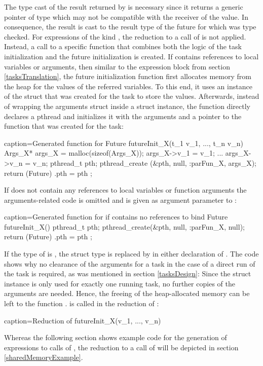 The type cast of the result returned by  is necessary since it returns a generic pointer of type  which may not be compatible with the receiver of the value. In consequence, the result is cast to the result type of the future for which  was type checked. 
For expressions of the kind , the reduction to a call of  is not applied. Instead, a call to a specific function  that combines both the logic of the task initialization and the future initialization is created. If  contains references to local variables or arguments, then similar to the  expression block from section \ref{tasksTranslation}, the future initialization function first allocates memory from the heap for the values of the referred variables. To this end, it uses an instance of the  struct that was created for the task to store the values. Afterwards, instead of wrapping the arguments struct inside a  struct instance, the function directly declares a pthread and initializes it with the arguments and a pointer to the function  that was created for the task:
\vspace{4mm}
\begin{ccode}{caption=Generated function for }
Future futureInit_X(t_1 v_1, ..., t_n v_n) { 
  Args_X* args_X = malloc(sizeof(Args_X)); 
  args_X->v_1 = v_1; 
  ...
  args_X->v_n = v_n; 
  pthread_t pth; 
  pthread_create (&pth, null, :parFun_X, args_X); 
  return (Future){ .pth = pth }; 
}
\end{ccode}
If  does not contain any references to local variables or function arguments the arguments-related code is omitted and  is given as argument parameter to :
\begin{ccode}{caption=Generated function for  if  contains no references to bind}
Future futureInit_X() {
  pthread_t pth; 
  pthread_create(&pth, null, :parFun_X, null); 
  return (Future){ .pth = pth }; 
}
\end{ccode}
If the type of  is , the struct type  is replaced by  in either declaration of . The code shows why no clearance of the arguments for a task in the case of a direct run of the task is required, as was mentioned in section \ref{tasksDesign}: Since the struct instance  is only used for exactly one running task, no further copies of the arguments are needed. Hence, the freeing of the heap-allocated memory can be left to the function .  is called in the reduction of :
\begin{ccode}{caption=Reduction of }
futureInit_X(v_1, ..., v_n)
\end{ccode}
Whereas the following section shows example code for the generation of expressions  to calls of  , the reduction to a call of  will be depicted in section \ref{sharedMemoryExample}.


